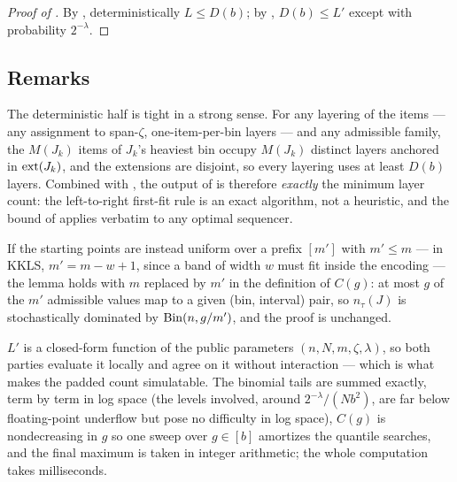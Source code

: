 \begin{proof}[Proof of ]
By , deterministically $L \le D(b)$; by ,
$D(b) \le L'$ except with probability $2^{-\lambda}$.
\end{proof}

\subsection{Remarks}

\begin{remark}
\label{rem:optimality}
The deterministic half is tight in a strong sense. For any layering of the
items --- any assignment to span-$\zeta$, one-item-per-bin layers --- and any
admissible family, the $M(J_k)$ items of $J_k$'s heaviest bin occupy
$M(J_k)$ distinct layers anchored in $\mathrm{ext}(J_k)$, and the extensions are
disjoint, so every layering uses at least $D(b)$ layers. Combined with
, the output of  is therefore
\emph{exactly} the minimum layer count: the left-to-right first-fit rule is
an exact algorithm, not a heuristic, and the bound of
 applies verbatim to any optimal sequencer.
\end{remark}

\begin{remark}
\label{rem:range}
If the starting points are instead uniform over a prefix $[m']$ with
$m' \le m$ --- in KKLS, $m' = m - w + 1$, since a band of width $w$ must fit
inside the encoding --- the lemma holds with $m$ replaced by $m'$ in the
definition of $C(g)$: at most $g$ of the $m'$ admissible values map to a
given (bin, interval) pair, so $n_\tau(J)$ is stochastically dominated by
$\mathrm{Bin}(n, g/m')$, and the proof is unchanged.
\end{remark}

\begin{remark}[Computing $L'$]
\label{rem:computing}
$L'$ is a closed-form function of the public parameters
$(n, N, m, \zeta, \lambda)$, so both parties evaluate it locally and agree
on it without interaction --- which is what makes the padded count
simulatable. The binomial tails are summed exactly, term by term in log
space (the levels involved, around $2^{-\lambda}/(Nb^2)$, are far below
floating-point underflow but pose no difficulty in log space), $C(g)$ is
nondecreasing in $g$ so one sweep over $g \in [b]$ amortizes the quantile
searches, and the final maximum is taken in integer arithmetic; the whole
computation takes milliseconds.
\end{remark}
